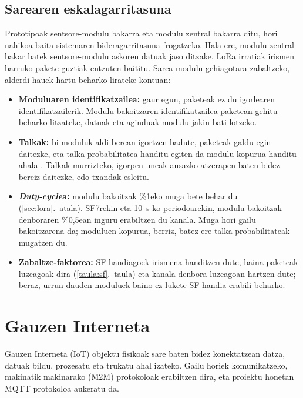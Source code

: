 \documentclass[10pt]{article}
\newcommand{\acpar}[1]{(\acs{#1})\acused{#1}}
\begin{document}
\subsection{Sarearen eskalagarritasuna}
\label{sec:eskalagarritasuna}

Prototipoak sentsore-modulu bakarra eta modulu zentral bakarra ditu, hori nahikoa baita sistemaren bideragarritasuna frogatzeko. Hala ere, modulu zentral bakar batek sentsore-modulu askoren datuak jaso ditzake, \ac{LoRa} irratiak irismen barruko pakete guztiak entzuten baititu. Sarea modulu gehiagotara zabaltzeko, alderdi hauek hartu beharko lirateke kontuan:
\begin{itemize}
    \item \textbf{Moduluaren identifikatzailea:} gaur egun, paketeak ez du igorlearen identifikatzailerik. Modulu bakoitzaren identifikatzailea paketean gehitu beharko litzateke, datuak eta aginduak modulu jakin bati lotzeko.
    \item \textbf{Talkak:} bi moduluk aldi berean igortzen badute, paketeak galdu egin daitezke, eta talka-probabilitatea handitu egiten da modulu kopurua handitu ahala \cite{bor2016}. Talkak murrizteko, igorpen-uneak ausazko atzerapen baten bidez bereiz daitezke, edo txandak esleitu.
    \item \textbf{\textit{Duty-cycle}a:} modulu bakoitzak \%1eko muga bete behar du (\ref{sec:lora}.~atala). SF7rekin eta 10~s-ko periodoarekin, modulu bakoitzak denboraren \%0,5ean inguru erabiltzen du kanala. Muga hori gailu bakoitzarena da; moduluen kopurua, berriz, batez ere talka-probabilitateak mugatzen du.
    \item \textbf{Zabaltze-faktorea:} SF handiagoek irismena handitzen dute, baina paketeak luzeagoak dira (\ref{taula:sf}.~taula) eta kanala denbora luzeagoan hartzen dute; beraz, urrun dauden moduluek baino ez lukete SF handia erabili beharko.
\end{itemize}

\clearpage
\section{Gauzen Interneta}
\label{chp:iot}

Gauzen Interneta \acpar{IoT} objektu fisikoak sare baten bidez konektatzean datza, datuak bildu, prozesatu eta trukatu ahal izateko. Gailu horiek komunikatzeko, makinatik makinarako \acpar{M2M} protokoloak erabiltzen dira, eta proiektu honetan \ac{MQTT} protokoloa aukeratu da.\\
\end{document}
